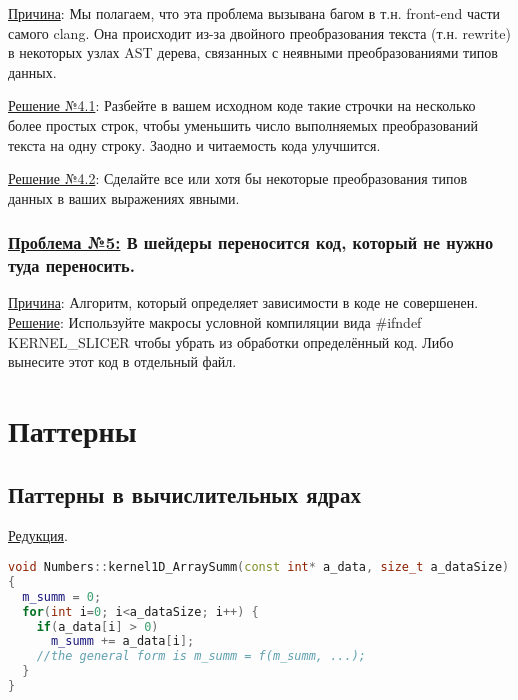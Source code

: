 \documentclass[11pt,fleqn,english,russian]{report} %
\begin{document}
\noindent\underline{Причина}: Мы полагаем, что эта проблема вызывана багом в т.н. front-end части самого clang. Она происходит из-за двойного преобразования текста (т.н. rewrite) в некоторых узлах AST дерева, связанных с неявными преобразованиями типов данных. 

\vspace*{5px}
\noindent\underline{Решение №4.1}: Разбейте в вашем исходном коде такие строчки на несколько более простых строк, чтобы уменьшить число выполняемых преобразований текста на одну строку. Заодно и читаемость кода улучшится.

\vspace*{5px}
\noindent\underline{Решение №4.2}: Сделайте все или хотя бы некоторые преобразования типов данных в ваших выражениях явными. 

\subsection{\underline{Проблема №5:} В шейдеры переносится код, который не нужно туда переносить.}

\noindent\underline{Причина}: Алгоритм, который определяет зависимости в коде не совершенен. \underline{Решение}: Используйте макросы условной компиляции вида \#ifndef KERNEL\_SLICER чтобы убрать из обработки определённый код. Либо вынесите этот код в отдельный файл.  


\chapter{Паттерны}\label{patterns}

\section{Паттерны в вычислительных ядрах}

\noindent\underline{Редукция}.

\begin{lstlisting}[language=C++, 
	               caption=паттерн редукции, 
	               label=lst:reduction]		
void Numbers::kernel1D_ArraySumm(const int* a_data, size_t a_dataSize)
{
  m_summ = 0; 
  for(int i=0; i<a_dataSize; i++) {
    if(a_data[i] > 0)
      m_summ += a_data[i];
    //the general form is m_summ = f(m_summ, ...); 
  }
}
\end{lstlisting}
\end{document}
